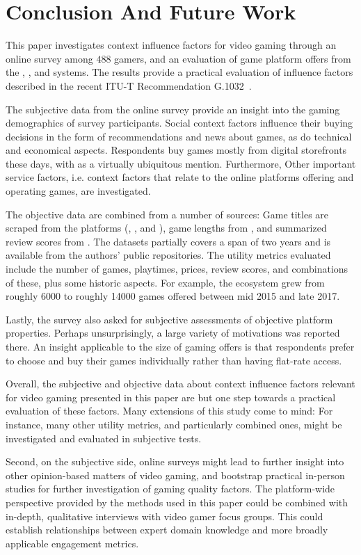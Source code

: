 \section{Conclusion And Future Work}
\label{sec:conclusion}

This paper investigates context influence factors for video gaming
through an online survey among $488$ gamers, and an evaluation of
game platform offers from the \steam, \psnow, and \gfnow systems.
The results provide a practical evaluation of influence factors
described in the recent \acrshort{ITU-T} Recommendation
G.1032~\cite{itutg1032}.

The subjective data from the online survey provide an insight into
the gaming demographics of survey participants.
Social context factors influence their buying decisions in the
form of recommendations and news about games, as do technical and
economical aspects.
Respondents buy games mostly from digital storefronts these days,
with \steam as a virtually ubiquitous mention.
Furthermore, Other important service factors, i.e. context factors
that relate to the online platforms offering and operating games,
are investigated.

The objective data are combined from a number of sources:
Game titles are scraped from the platforms (\gfnow, \psnow, and \steam),
game lengths from \hltb, and summarized review scores from
\metacritic.
The datasets partially covers a span of two years and is available from the authors' public repositories.
The utility metrics evaluated include the number
of games, playtimes, prices, review scores, and combinations of these,
plus some historic aspects.
For example, the \steam ecosystem grew from roughly \num{6000} to roughly
\num{14000} games offered between mid 2015 and late 2017.

Lastly, the survey also asked for subjective assessments of objective
platform properties. Perhaps unsurprisingly, a large variety of
motivations was reported there. An insight applicable to the size
of gaming offers is that respondents prefer to choose and buy their 
games individually rather than having flat-rate access.

Overall, the subjective and objective data about context influence
factors relevant for video gaming presented in this paper are but
one step towards a practical evaluation of these factors.
Many extensions of this study come to mind:
For instance, many other utility metrics, and
particularly combined ones, might be investigated and evaluated
in subjective tests.

Second, on the subjective side, online surveys might lead to further
insight into other opinion-based matters of video gaming, and bootstrap
practical in-person studies for further investigation of gaming quality
factors.
The platform-wide perspective provided by the methods used in
this paper could be combined with in-depth, qualitative interviews with
video gamer focus groups. This could establish relationships between
expert domain knowledge and more broadly applicable engagement metrics.
